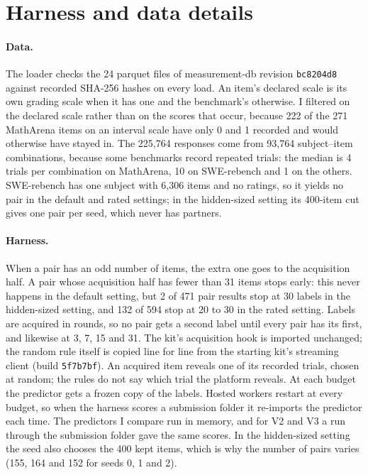 \section{Harness and data details}\label{app:harness}

\paragraph{Data.}
The loader checks the 24 parquet files of measurement-db revision \texttt{bc8204d8} against recorded SHA-256 hashes on every load. An item's declared scale is its own grading scale when it has one and the benchmark's otherwise. I filtered on the declared scale rather than on the scores that occur, because 222 of the 271 MathArena items on an interval scale have only 0 and 1 recorded and would otherwise have stayed in. The 225,764 responses come from 93,764 subject--item combinations, because some benchmarks record repeated trials: the median is 4 trials per combination on MathArena, 10 on SWE-rebench and 1 on the others. SWE-rebench has one subject with 6,306 items and no ratings, so it yields no pair in the default and rated settings; in the hidden-sized setting its 400-item cut gives one pair per seed, which never has partners.

\paragraph{Harness.}
When a pair has an odd number of items, the extra one goes to the acquisition half. A pair whose acquisition half has fewer than 31 items stops early: this never happens in the default setting, but 2 of 471 pair results stop at 30 labels in the hidden-sized setting, and 132 of 594 stop at 20 to 30 in the rated setting. Labels are acquired in rounds, so no pair gets a second label until every pair has its first, and likewise at 3, 7, 15 and 31. The kit's acquisition hook is imported unchanged; the random rule itself is copied line for line from the starting kit's streaming client (build \texttt{5f7b7bf}). An acquired item reveals one of its recorded trials, chosen at random; the rules do not say which trial the platform reveals. At each budget the predictor gets a frozen copy of the labels. Hosted workers restart at every budget, so when the harness scores a submission folder it re-imports the predictor each time. The predictors I compare run in memory, and for V2 and V3 a run through the submission folder gave the same scores. In the hidden-sized setting the seed also chooses the 400 kept items, which is why the number of pairs varies (155, 164 and 152 for seeds 0, 1 and 2).

